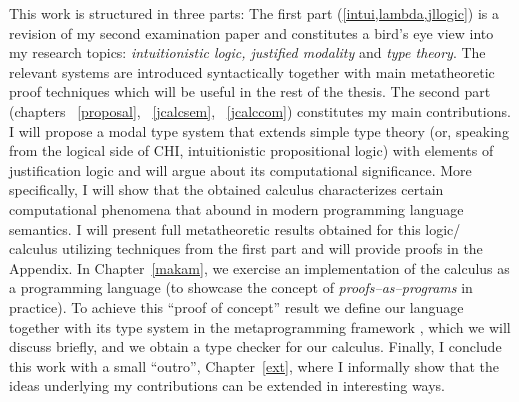            This work  is structured in three parts: 
           The first part (\cref{intui,lambda,jllogic}) is a revision of my second examination paper and constitutes 
           a bird's eye view into my 
           research topics:  
           \emph{intuitionistic logic, justified modality} and \emph{type theory}. 
           The relevant systems are introduced syntactically together with main 
            metatheoretic proof techniques which will be useful 
           in the rest of the thesis.
           The second part (chapters ~\ref{proposal}, ~\ref{jcalcsem}, ~\ref{jcalccom}) 
           constitutes my main contributions.
           I will propose  
           a modal type system that extends simple type theory
            (or, speaking from the logical side of \ac{CHI}, 
           intuitionistic propositional logic) with elements of
            justification logic and will argue about its computational significance. 
            More specifically, I will show  
           that the obtained calculus characterizes  certain 
           computational phenomena that abound in modern programming language semantics. 
           I will present full metatheoretic
           results obtained for this logic/ calculus utilizing techniques from the first part 
           and will provide proofs in the Appendix. 
           In Chapter~\ref{makam}, we exercise an implementation of the calculus 
           as a programming language (to showcase the concept of \emph{proofs--as--programs} in practice). To achieve this ``proof of concept'' result we define our 
           language together with its type system
           in the metaprogramming framework , which we will discuss briefly, 
           and we obtain a type checker for our calculus. 
           Finally, I conclude this work with a small ``outro'', Chapter~\ref{ext},
           where I informally show that the ideas underlying my contributions 
           can be extended in interesting ways.


